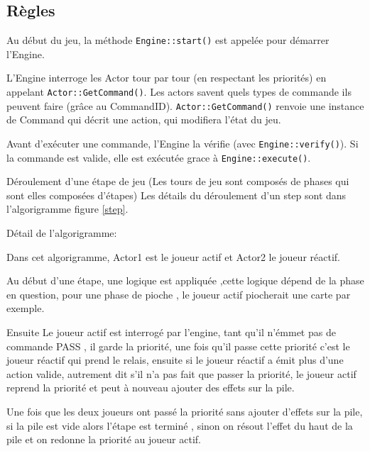 \documentclass[a4paper,12pt]{article}
\begin{document}
\subsection{Règles}

Au début du jeu, la méthode \texttt{Engine::start()} est appelée pour démarrer l'Engine.

L'Engine interroge les Actor tour par tour (en respectant les priorités) en appelant \texttt{Actor::GetCommand()}.
Les actors savent quels types de commande ils peuvent faire (grâce au CommandID).
\texttt{Actor::GetCommand()} renvoie une instance de Command qui décrit une action, qui modifiera l'état du jeu.

Avant d'exécuter une commande, l'Engine la vérifie (avec \texttt{Engine::verify()}).
Si la commande est valide, elle est exécutée grace à \texttt{Engine::execute()}.


Déroulement d'une étape de jeu (Les tours de jeu sont composés de phases qui sont elles composées d'étapes)
Les détails du déroulement d'un step sont dans l'algorigramme figure \ref{step}.

Détail de l'algorigramme:

Dans cet algorigramme, Actor1 est le joueur actif et Actor2 le joueur réactif.

Au début d'une étape, une logique est appliquée ,cette logique dépend de la phase en question, pour une phase de pioche , le joueur actif piocherait une carte par exemple.

Ensuite Le joueur actif est interrogé par l'engine, tant qu'il n'émmet pas de commande PASS , il garde la priorité, une fois qu'il passe cette priorité c'est le joueur réactif qui prend le relais, ensuite si le joueur réactif a émit plus d'une action valide, autrement dit s'il n'a pas fait que passer la priorité, le joueur actif reprend la priorité et peut à nouveau ajouter des effets sur la pile.

Une fois que les deux joueurs ont passé la priorité sans ajouter d'effets sur la pile, si la pile est vide alors l'étape est terminé , sinon on résout l'effet du haut de la pile et on redonne la priorité au joueur actif. 
\end{document}
